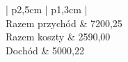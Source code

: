 \documentclass[a4paper,10pt,landscape]{article}
\begin{document}
\vfill
		\begin{table}[H]
			\begin{flushright}
				\scriptsize
		\begin{tabular}{| p{} | p{} |}
			\hline
			 \\ \hline
			Razem przychód & 7200,25 \\ \hline
			Razem koszty & 2590,00 \\ \hline
			\hline
			Dochód & 5000,22  \\ \hline
		\end{tabular}
	\end{flushright}
	\end{table}

	
\end{document}

